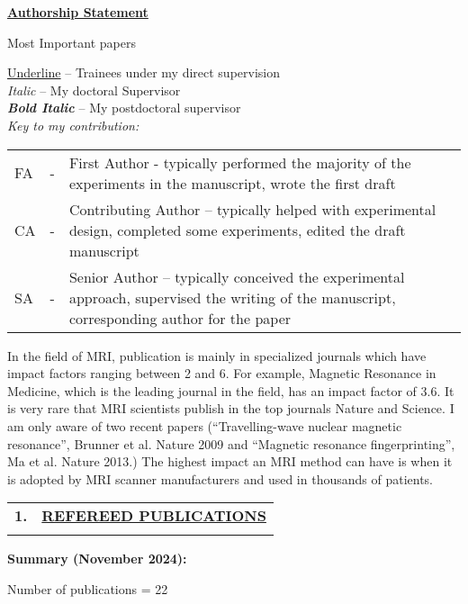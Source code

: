 \documentclass[11pt,notitlepage,english]{report}
\begin{document}
\noindent\textbf{\underline{Authorship Statement}}

\vspace{5pt}
\noindent* Most Important papers 
\vspace{5pt}

\noindent\underline{Underline} – Trainees under my direct supervision \\
\textit{Italic} – My doctoral Supervisor\\
\textit{\textbf{Bold Italic}} – My postdoctoral supervisor\\

\noindent\textit{Key to my contribution:} \\
\begin{longtable}{ L{.4cm} L{.2cm}  L{15.2cm}  }
  FA & - & First Author - typically performed the majority of the experiments in the manuscript, wrote the first draft \\
  CA & - & Contributing Author – typically helped with experimental design, completed some experiments, edited the draft manuscript \\
  SA & - & Senior Author – typically conceived the experimental approach, supervised the writing of the manuscript, corresponding author for the paper\\
\end{longtable}

In the field of MRI, publication is mainly in specialized journals which have
impact factors ranging between 2 and 6. For example, Magnetic Resonance in
Medicine, which is the leading journal in the field, has an impact factor of
3.6. It is very rare that MRI scientists publish in the top journals Nature and
Science. I am only aware of two recent papers (“Travelling-wave nuclear
magnetic resonance”, Brunner et al. Nature 2009 and “Magnetic resonance
fingerprinting”, Ma et al. Nature 2013.) The highest impact an MRI method can
have is when it is adopted by MRI scanner manufacturers and used in thousands
of patients.

\begin{tabular}{L{.5cm} L{18.9cm} }
  \\
  \textbf{1.}  & \underline{\textbf{REFEREED PUBLICATIONS}}                                      \\
  \\
\end{tabular}

\textbf{Summary (November 2024):} 

\hspace{1cm} Number of publications = 22
\end{document}
